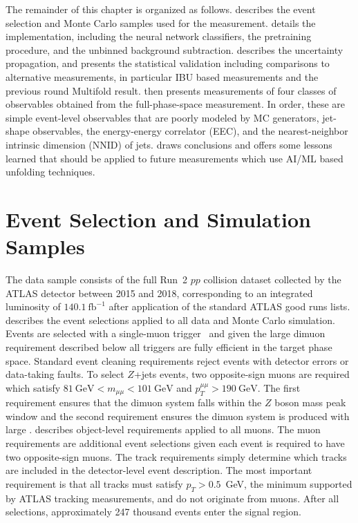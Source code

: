 The remainder of this chapter is organized as follows.
 describes the event selection and Monte Carlo samples used for the measurement.
 details the \Omnifold implementation, including the neural network classifiers, the pretraining procedure, and the unbinned background subtraction.
 describes the uncertainty propagation, and  presents the statistical validation including comparisons to alternative measurements, in particular IBU based measurements and the previous round Multifold result.
 then presents measurements of four classes of observables obtained from the full-phase-space measurement.
In order, these are simple event-level observables that are poorly modeled by MC generators, jet-shape observables, the energy-energy correlator (EEC), and the nearest-neighbor intrinsic dimension (NNID) of jets.
 draws conclusions and offers some lessons learned that should be applied to future measurements which use AI/ML based unfolding techniques.

\FloatBarrier

\section{Event Selection and Simulation Samples}
\label{sec:zjets-eventsel}

The data sample consists of the full Run~2 $pp$ collision dataset collected by the ATLAS detector between 2015 and 2018, corresponding to an integrated luminosity of $140.1~\mathrm{fb}^{-1}$ after application of the standard ATLAS good runs lists.
 describes the event selections applied to all data and Monte Carlo simulation.
Events are selected with a single-muon trigger~\cite{TRIG-2018-01} and given the large dimuon \pt requirement described below all triggers are fully efficient in the target phase space.
Standard event cleaning requirements reject events with detector errors or data-taking faults.
To select $Z$+jets events, two opposite-sign muons are required which satisfy $81~\mathrm{GeV} < m_{\mu\mu} < 101~\mathrm{GeV}$ and $p_T^{\mu\mu} > 190~\mathrm{GeV}$.
The first requirement ensures that the dimuon system falls within the $Z$ boson mass peak window and the second requirement ensures the dimuon system is produced with large \pt.
 describes object-level requirements applied to all muons.
The muon requirements are additional event selections given each event is required to have two opposite-sign muons.
The track requirements simply determine which tracks are included in the detector-level event description.
The most important requirement is that all tracks must satisfy $p_T > 0.5$~GeV, the minimum \pt supported by ATLAS tracking measurements, and do not originate from muons.
After all selections, approximately 247 thousand events enter the signal region.

